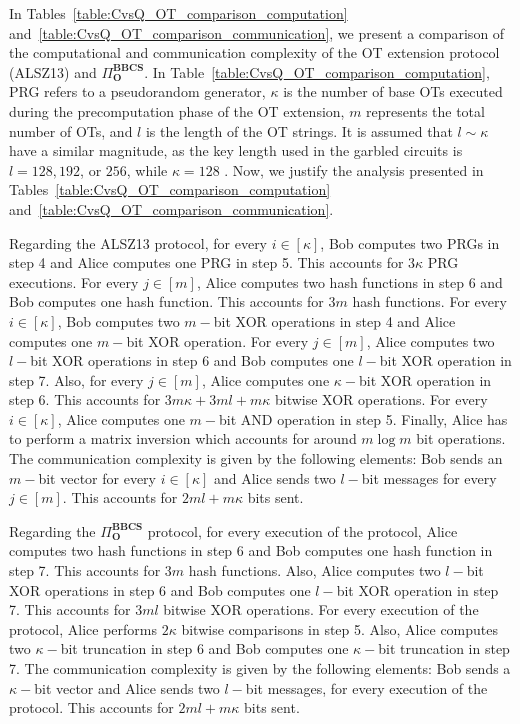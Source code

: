 In Tables~\ref{table:CvsQ_OT_comparison_computation} and~\ref{table:CvsQ_OT_comparison_communication}, we present a comparison of the computational and communication complexity of the OT extension protocol (ALSZ13) and $\Pi^{\textbf{BBCS}}_{\textbf{O}}$. In Table~\ref{table:CvsQ_OT_comparison_computation}, PRG refers to a pseudorandom generator, $\kappa$ is the number of base OTs executed during the precomputation phase of the OT extension, $m$ represents the total number of OTs, and $l$ is the length of the OT strings. It is assumed that $l \sim \kappa$ have a similar magnitude, as the key length used in the garbled circuits is $l = 128, 192$, or $256$, while $\kappa = 128$ \cite{ALSZ13}. Now, we justify the analysis presented in Tables~\ref{table:CvsQ_OT_comparison_computation} and~\ref{table:CvsQ_OT_comparison_communication}. 

Regarding the ALSZ13 protocol, for every $i\in[\kappa]$, Bob computes two PRGs in step 4 and Alice computes one PRG in step 5. This accounts for $3\kappa$ PRG executions. For every $j \in[m]$, Alice computes two hash functions in step 6 and Bob computes one hash function. This accounts for $3m$ hash functions. For every $i\in[\kappa]$, Bob computes two $m-$bit XOR operations in step 4 and Alice computes one $m-$bit XOR operation. For every $j \in[m]$, Alice computes two $l-$bit XOR operations in step 6 and Bob computes one $l-$bit XOR operation in step 7. Also, for every $j \in[m]$, Alice computes one $\kappa-$bit XOR operation in step 6. This accounts for $3m\kappa + 3ml + m\kappa$ bitwise XOR operations. For every $i\in[\kappa]$, Alice computes one $m-$bit AND operation in step 5. Finally, Alice has to perform a matrix inversion which accounts for around $m\log m$ bit operations. The communication complexity is given by the following elements: Bob sends an $m-$bit vector for every $i\in[\kappa]$ and Alice sends two $l-$bit messages for every $j \in[m]$. This accounts for $2ml + m\kappa$ bits sent.

Regarding the $\Pi^{\textbf{BBCS}}_{\textbf{O}}$ protocol, for every execution of the protocol, Alice computes two hash functions in step 6 and Bob computes one hash function in step 7. This accounts for $3m$ hash functions. Also, Alice computes two $l-$bit XOR operations in step 6 and Bob computes one $l-$bit XOR operation in step 7. This accounts for $3ml$ bitwise XOR operations. For every execution of the protocol, Alice performs $2\kappa$ bitwise comparisons in step 5. Also, Alice computes two $\kappa-$bit truncation in step 6 and Bob computes one $\kappa-$bit truncation in step 7. The communication complexity is given by the following elements: Bob sends a $\kappa-$bit vector and Alice sends two $l-$bit messages, for every execution of the protocol. This accounts for $2ml + m\kappa$ bits sent.

